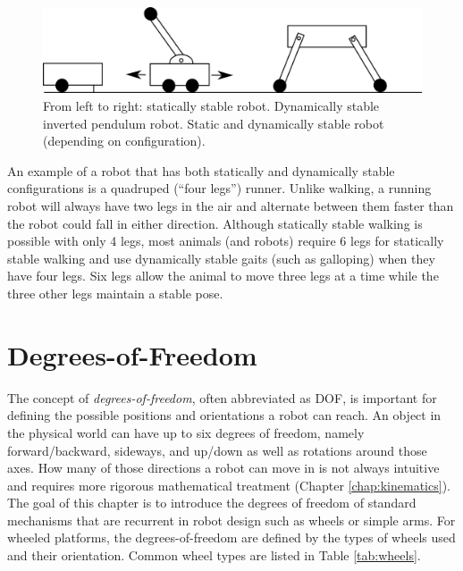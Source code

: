 \begin{figure}
	\centering
		\includegraphics[width=\textwidth]{figs/stability.png}
	\caption{From left to right: statically stable robot. Dynamically stable inverted pendulum robot. Static and dynamically stable robot (depending on configuration).}
	\label{fig:stability}
\end{figure}

An example of a robot that has both statically and dynamically stable configurations is a quadruped (``four legs'') runner. Unlike walking, a running robot will always have two legs in the air and alternate between them faster than the robot could fall in either direction. Although statically stable walking is possible with only 4 legs, most animals (and robots) require 6 legs for statically stable walking and use dynamically stable gaits (such as galloping) when they have four legs. Six legs allow the animal to move three legs at a time while the three other legs maintain a stable pose.


\section{Degrees-of-Freedom}\label{sec:dof}
The concept of \emph{degrees-of-freedom}, often abbreviated as DOF, is important for defining the possible positions and orientations a robot can reach. An object in the physical world can have up to six degrees of freedom, namely forward/backward, sideways, and up/down as well as rotations around those axes. How many of those directions a robot can move in is not always intuitive and requires more rigorous mathematical treatment (Chapter \ref{chap:kinematics}). The goal of this chapter is to introduce the degrees of freedom of standard mechanisms that are recurrent in robot design such as wheels or simple arms. For wheeled platforms, the degrees-of-freedom are defined by the types of wheels used and their orientation. Common wheel types are listed in Table \ref{tab:wheels}.

